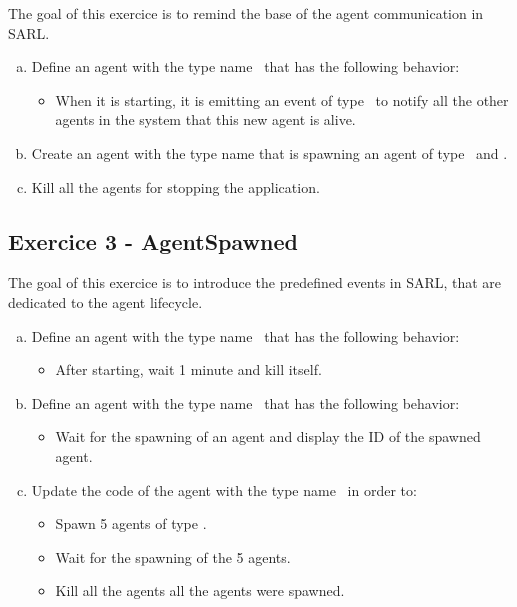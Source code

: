 \documentclass[english,nodocumentinfo,nopubpage]{utbmciadreport}
\begin{document}
The goal of this exercice is to remind the base of the agent communication in SARL.

\begin{enumerate}[a)]
\item Define an agent with the type name \ that has the following behavior:
	\begin{itemize}
	\item When it is starting, it is emitting an event of type \ to notify all the other agents in the system that this new agent is alive.
	\end{itemize}
\item Create an agent with the type name  that is spawning an agent of type \ and .
\item Kill all the agents for stopping the application.
\end{enumerate}

\subsection{Exercice 3 - AgentSpawned}

The goal of this exercice is to introduce the predefined events in SARL, that are dedicated to the agent lifecycle.

\begin{enumerate}[a)]
\item Define an agent with the type name \ that has the following behavior:
	\begin{itemize}
	\item After starting, wait 1 minute and kill itself.
	\end{itemize}
\item Define an agent with the type name \ that has the following behavior:
	\begin{itemize}
	\item Wait for the spawning of an agent and display the ID of the spawned agent.
	\end{itemize}
\item Update the code of the agent with the type name \ in order to:
	\begin{itemize}
	\item Spawn 5 agents of type .
	\item Wait for the spawning of the 5 agents.
	\item Kill all the agents  all the agents were spawned.
	\end{itemize}
\end{enumerate}
\end{document}
